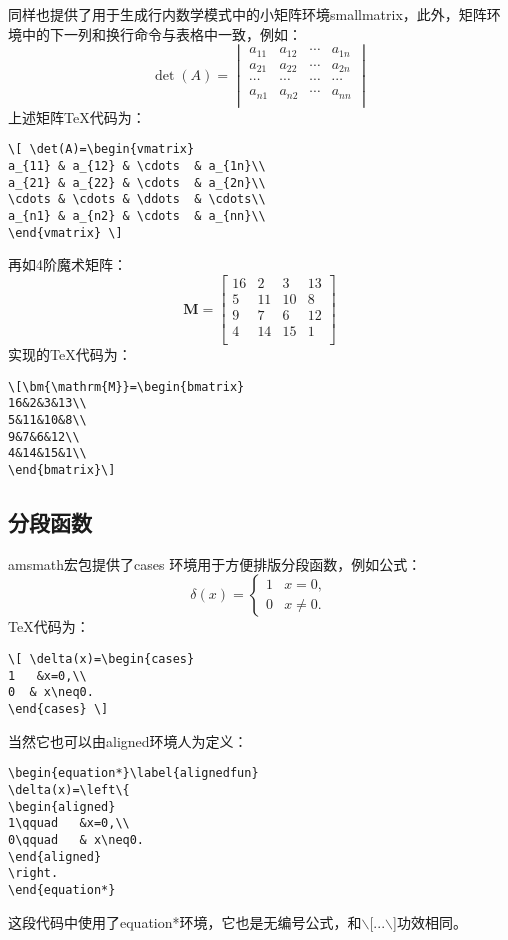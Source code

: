 同样也提供了用于生成行内数学模式中的小矩阵环境smallmatrix，此外，矩阵环境中的下一列和换行命令与表格中一致，例如：
\[ \det(A)=\begin{vmatrix}
a_{11} & a_{12} & \cdots  & a_{1n}\\
a_{21} & a_{22} & \cdots  & a_{2n}\\
\cdots & \cdots & \cdots  & \cdots\\
a_{n1} & a_{n2} & \cdots  & a_{nn}\\
\end{vmatrix} \]上述矩阵\TeX{}代码为：
\begin{lstlisting}
\[ \det(A)=\begin{vmatrix}
a_{11} & a_{12} & \cdots  & a_{1n}\\
a_{21} & a_{22} & \cdots  & a_{2n}\\
\cdots & \cdots & \ddots  & \cdots\\
a_{n1} & a_{n2} & \cdots  & a_{nn}\\
\end{vmatrix} \]
\end{lstlisting}
再如4阶魔术矩阵：
\[\bm{M}=\begin{bmatrix}
	16&2&3&13\\
	5&11&10&8\\
	9&7&6&12\\
	4&14&15&1\\
\end{bmatrix}\]实现的\TeX{}代码为：
\begin{lstlisting}
\[\bm{\mathrm{M}}=\begin{bmatrix}
16&2&3&13\\
5&11&10&8\\
9&7&6&12\\
4&14&15&1\\
\end{bmatrix}\]
\end{lstlisting}
\subsection{分段函数}
amsmath宏包提供了cases 环境用于方便排版分段函数，例如公式：
\[ \delta(x)=\begin{cases}
1   &x=0,\\
0  & x\neq0.
\end{cases} \]\TeX{}代码为：
\begin{lstlisting}
\[ \delta(x)=\begin{cases}
1   &x=0,\\
0  & x\neq0.
\end{cases} \]
\end{lstlisting}
当然它也可以由aligned环境人为定义：
\begin{lstlisting}
\begin{equation*}\label{alignedfun}
\delta(x)=\left\{
\begin{aligned}
1\qquad   &x=0,\\
0\qquad   & x\neq0.	
\end{aligned}
\right.
\end{equation*}
\end{lstlisting}
这段代码中使用了equation*环境，它也是无编号公式，和$\backslash$[...$\backslash$]功效相同。

